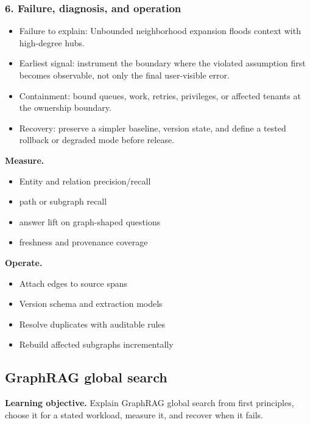 \subsubsection*{6. Failure, diagnosis, and operation}
\begin{itemize}
\item Failure to explain: Unbounded neighborhood expansion floods context with high-degree hubs.
\item Earliest signal: instrument the boundary where the violated assumption first becomes observable, not only the final user-visible error.
\item Containment: bound queues, work, retries, privileges, or affected tenants at the ownership boundary.
\item Recovery: preserve a simpler baseline, version state, and define a tested rollback or degraded mode before release.
\end{itemize}
\textbf{Measure.}\begin{itemize}
\item Entity and relation precision/recall
\item path or subgraph recall
\item answer lift on graph-shaped questions
\item freshness and provenance coverage
\end{itemize}
\textbf{Operate.}\begin{itemize}
\item Attach edges to source spans
\item Version schema and extraction models
\item Resolve duplicates with auditable rules
\item Rebuild affected subgraphs incrementally
\end{itemize}
\subsection{GraphRAG global search}
\textbf{Learning objective.} Explain GraphRAG global search from first principles, choose it for a stated workload, measure it, and recover when it fails.
